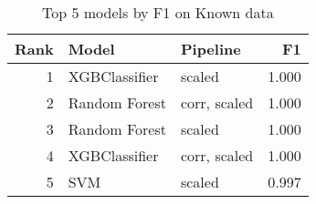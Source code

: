 \begin{table}[!htb]
\caption{Top 5 models by F1 on Known data}
\label{table-top-5-f1-known}
\centering
\begin{tabular}{rllr}
\toprule
Rank & Model & Pipeline & F1 \\
\midrule
1 & XGBClassifier & scaled & 1.000 \\
2 & Random Forest & corr, scaled & 1.000 \\
3 & Random Forest & scaled & 1.000 \\
4 & XGBClassifier & corr, scaled & 1.000 \\
5 & SVM & scaled & 0.997 \\
\bottomrule
\end{tabular}
\end{table}
